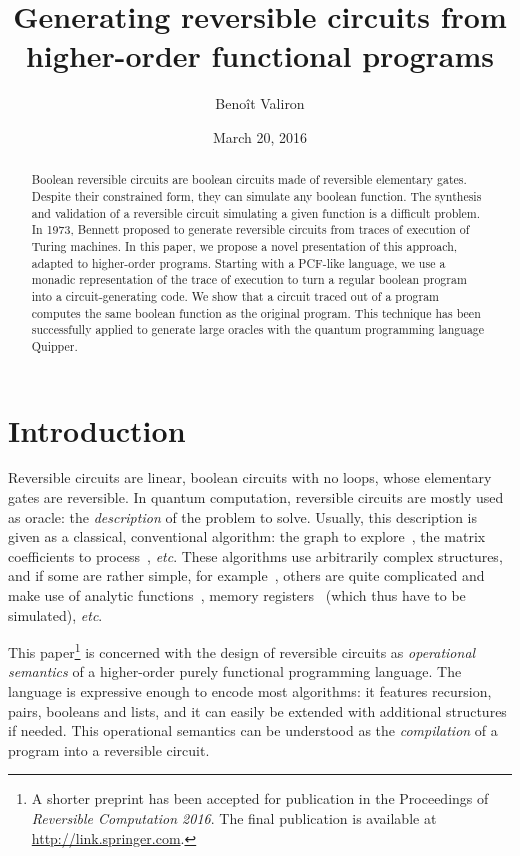 \documentclass{article}
\title{Generating reversible circuits from higher-order functional
  programs}
\author{Beno\^{i}t Valiron}
\date{March 20, 2016}
\theoremstyle{plain}
\theoremstyle{definition}
\begin{document}
\maketitle

\begin{abstract}
Boolean reversible circuits are boolean circuits made of reversible
elementary gates. Despite their constrained form, they can simulate
any boolean function. The synthesis and validation of a reversible
circuit simulating a given function is a difficult problem. In 1973,
Bennett proposed to generate reversible circuits from traces of
execution of Turing machines.
In this paper, we propose a novel presentation of this approach,
adapted to higher-order programs. Starting with a PCF-like language,
we use a monadic representation of the trace of execution to turn a
regular boolean program into a circuit-generating code. We show that a
circuit traced out of a program computes the same boolean function as
the original program.
This technique has been successfully applied to generate large oracles
with the quantum programming language Quipper.
\end{abstract}


\section{Introduction}
\label{sec:introduction}

Reversible circuits are linear, boolean circuits with no loops, whose
elementary gates are reversible. 
In quantum computation, reversible circuits are mostly used as oracle:
the {\em description} of the problem to solve. Usually, this
description is given as a classical, conventional algorithm: the graph
to explore~\cite{TF}, the matrix coefficients to process~\cite{QLSA},
{\em etc}. These algorithms use arbitrarily complex structures, and if some
are rather simple, for example~\cite{shor}, others are quite complicated and make use of
analytic functions~\cite{QLSA}, memory registers~\cite{BF} (which
thus have to be simulated), {\em etc}.

This paper\footnote{A shorter preprint has been  accepted for publication in the Proceedings of {\em Reversible Computation 2016}.
The final publication is available at
  \url{http://link.springer.com}.} is concerned with the design of reversible circuits as {\em
  operational semantics} of a higher-order purely functional
programming language. The language is
 expressive enough to encode most algorithms: it features
recursion, pairs, booleans and lists, and it can easily be extended
with additional structures if needed. This operational semantics can be
understood as the {\em compilation} of a program into a reversible
circuit.
\end{document}
